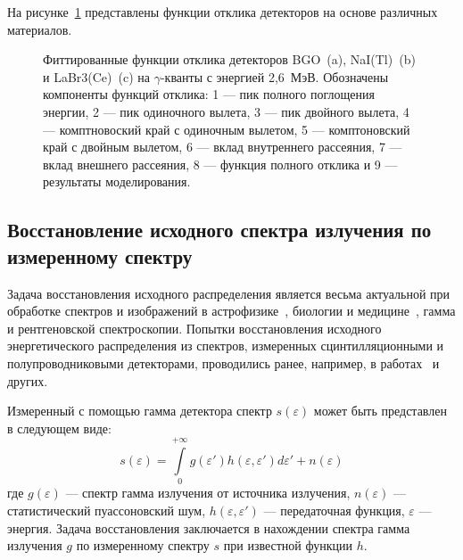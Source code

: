 На рисунке~\ref{fig:scintillatorResponseExample} представлены функции отклика детекторов на основе различных материалов. 

\begin{figure}[ht]
  \caption{ Фиттированные функции отклика детекторов BGO~(a), NaI(Tl)~(b) и LaBr3(Ce)~(c) на $\gamma$-кванты с энергией 2,6~МэВ. Обозначены компоненты функций отклика: 1 --- пик полного поглощения энергии, 2 --- пик одиночного вылета, 3 --- пик двойного вылета, 4 --- комптновоский край с одиночным вылетом, 5 — комптоновский край с двойным вылетом, 6 --- вклад внутреннего рассеяния, 7 --- вклад внешнего рассеяния, 8 --- функция полного отклика и 9 --- результаты моделирования.~\cite{Grozdanov2021}}
  \label{fig:scintillatorResponseExample}
\end{figure}


\subsection{Восстановление исходного спектра излучения по измеренному спектру}
\label{sec:deconvolutionMlemMethod}

Задача восстановления исходного распределения является весьма актуальной при обработке спектров и изображений в астрофизике~\cite{JungRichardt2016}, биологии и медицине~\cite{Vardi1985}, гамма и рентгеновской спектроскопии. Попытки восстановления исходного энергетического распределения из спектров, измеренных сцинтилляционными и полупроводниковыми детекторами, проводились ранее, например, в работах~\cite{Raad2008,Meng2000} и других.

Измеренный с помощью гамма детектора спектр $s(\varepsilon)$ может быть представлен в следующем виде:
\begin{equation}
  \label{eq:BaseConvolution}
  s(\varepsilon) = \int \limits_0^{+\infty} g( \varepsilon' ) h( \varepsilon, \varepsilon' ) d \varepsilon' + n(\varepsilon)
\end{equation}
где $g(\varepsilon)$ --- спектр гамма излучения от источника излучения, $n(\varepsilon)$ --- статистический пуассоновский шум, $ h( \varepsilon, \varepsilon' ) $ --- передаточная функция, $\varepsilon$ --- энергия. Задача восстановления заключается в нахождении спектра гамма излучения $g$ по измеренному спектру $s$ при известной функции $h$.~\cite{Meng2000,Khilkevitch2013}

